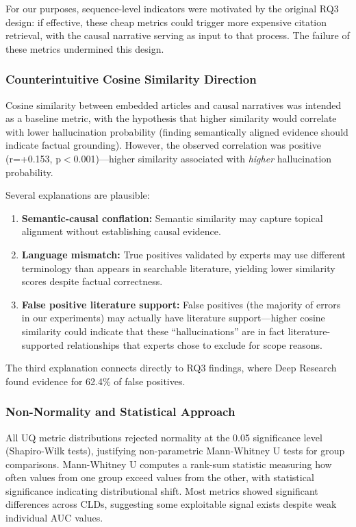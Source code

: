 For our purposes, sequence-level indicators were motivated by the original RQ3 design: if effective, these cheap metrics could trigger more expensive citation retrieval, with the causal narrative serving as input to that process. The failure of these metrics undermined this design.

\subsubsection{Counterintuitive Cosine Similarity Direction}

Cosine similarity between embedded articles and causal narratives was intended as a baseline metric, with the hypothesis that higher similarity would correlate with lower hallucination probability (finding semantically aligned evidence should indicate factual grounding). However, the observed correlation was positive (r=+0.153, p$<$0.001)---higher similarity associated with \textit{higher} hallucination probability.

Several explanations are plausible:
\begin{enumerate}[noitemsep]
    \item \textbf{Semantic-causal conflation:} Semantic similarity may capture topical alignment without establishing causal evidence.
    \item \textbf{Language mismatch:} True positives validated by experts may use different terminology than appears in searchable literature, yielding lower similarity scores despite factual correctness.
    \item \textbf{False positive literature support:} False positives (the majority of errors in our experiments) may actually have literature support---higher cosine similarity could indicate that these ``hallucinations'' are in fact literature-supported relationships that experts chose to exclude for scope reasons.
\end{enumerate}

The third explanation connects directly to RQ3 findings, where Deep Research found evidence for 62.4\% of false positives.

\subsubsection{Non-Normality and Statistical Approach}

All UQ metric distributions rejected normality at the 0.05 significance level (Shapiro-Wilk tests), justifying non-parametric Mann-Whitney U tests for group comparisons. Mann-Whitney U computes a rank-sum statistic measuring how often values from one group exceed values from the other, with statistical significance indicating distributional shift. Most metrics showed significant differences across CLDs, suggesting some exploitable signal exists despite weak individual AUC values.

